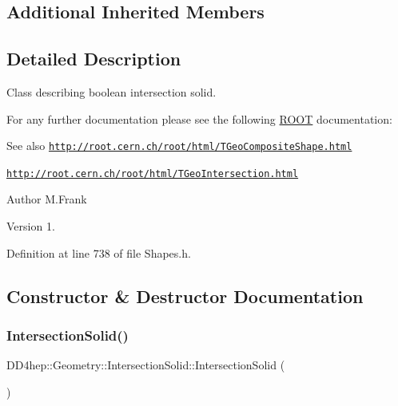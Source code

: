 \subsection*{Additional Inherited Members}


\subsection{Detailed Description}
Class describing boolean intersection solid. 

For any further documentation please see the following \hyperlink{namespace_r_o_o_t}{R\+O\+OT} documentation\+: \begin{DoxySeeAlso}{See also}
\href{http://root.cern.ch/root/html/TGeoCompositeShape.html}{\tt http\+://root.\+cern.\+ch/root/html/\+T\+Geo\+Composite\+Shape.\+html} 

\href{http://root.cern.ch/root/html/TGeoIntersection.html}{\tt http\+://root.\+cern.\+ch/root/html/\+T\+Geo\+Intersection.\+html}
\end{DoxySeeAlso}
\begin{DoxyAuthor}{Author}
M.\+Frank 
\end{DoxyAuthor}
\begin{DoxyVersion}{Version}
1. 
\end{DoxyVersion}


Definition at line 738 of file Shapes.\+h.



\subsection{Constructor \& Destructor Documentation}
\hypertarget{class_d_d4hep_1_1_geometry_1_1_intersection_solid_a25668c54b50ea91e0728456ad7a17202}{}\label{class_d_d4hep_1_1_geometry_1_1_intersection_solid_a25668c54b50ea91e0728456ad7a17202} 
\subsubsection{\texorpdfstring{Intersection\+Solid()}{IntersectionSolid()}\hspace{0.1cm}{\footnotesize\ttfamily [1/8]}}
{\footnotesize\ttfamily D\+D4hep\+::\+Geometry\+::\+Intersection\+Solid\+::\+Intersection\+Solid (\begin{DoxyParamCaption}{ }\end{DoxyParamCaption})\hspace{0.3cm}{\ttfamily [default]}}




